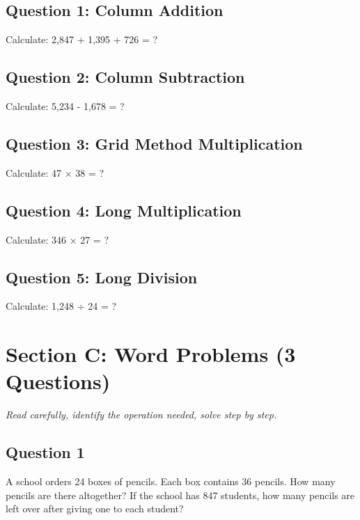 \documentclass{article}
\begin{document}
\subsection*{Question 1: Column Addition}
Calculate: 2,847 + 1,395 + 726 = ?

\vspace{2cm}

\subsection*{Question 2: Column Subtraction}
Calculate: 5,234 - 1,678 = ?

\vspace{2cm}

\subsection*{Question 3: Grid Method Multiplication}
Calculate: 47 × 38 = ?

\vspace{3cm}

\subsection*{Question 4: Long Multiplication}
Calculate: 346 × 27 = ?

\vspace{3cm}

\subsection*{Question 5: Long Division}
Calculate: 1,248 ÷ 24 = ?

\vspace{3cm}

\section{Section C: Word Problems (3 Questions)}
\textit{Read carefully, identify the operation needed, solve step by step.}

\subsection*{Question 1}
A school orders 24 boxes of pencils. Each box contains 36 pencils. How many pencils are there altogether? If the school has 847 students, how many pencils are left over after giving one to each student?

\vspace{4cm}
\end{document}
